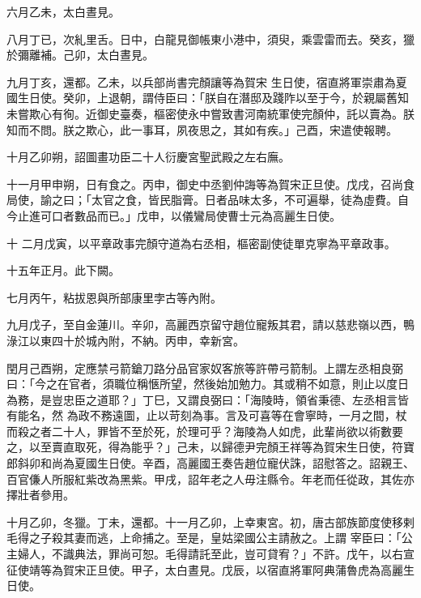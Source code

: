\begin{pinyinscope}
 六月乙未，太白晝見。



 八月丁已，次糺里舌。日中，白龍見御帳東小港中，須臾，乘雲雷而去。癸亥，獵於彌離補。己卯，太白晝見。



 九月丁亥，還都。乙未，以兵部尚書完顏讓等為賀宋
 生日使，宿直將軍崇肅為夏國生日使。癸卯，上退朝，謂侍臣曰：「朕自在潛邸及踐阼以至于今，於親屬舊知未嘗欺心有徇。近御史臺奏，樞密使永中嘗致書河南統軍使完顏仲，託以賣為。朕知而不問。朕之欺心，此一事耳，夙夜思之，其如有疾。」己酉，宋遣使報聘。



 十月乙卯朔，詔圖畫功臣二十人衍慶宮聖武殿之左右廡。



 十一月甲申朔，日有食之。丙申，御史中丞劉仲誨等為賀宋正旦使。戊戌，召尚食局使，諭之曰；「太官之食，皆民脂膏。日者品味太多，不可遍舉，徒為虛費。自今止進可口者數品而已。」戊申，以儀鸞局使曹士元為高麗生日使。



 十
 二月戊寅，以平章政事完顏守道為右丞相，樞密副使徒單克寧為平章政事。



 十五年正月。此下闕。



 七月丙午，粘拔恩與所部康里孛古等內附。



 九月戊子，至自金蓮川。辛卯，高麗西京留守趙位寵叛其君，請以慈悲嶺以西，鴨淥江以東四十於城內附，不納。丙申，幸新宮。



 閏月己酉朔，定應禁弓箭鎗刀路分品官家奴客旅等許帶弓箭制。上謂左丞相良弼曰：「今之在官者，須職位稱愜所望，然後始加勉力。其或稍不如意，則止以度日為務，是豈忠臣之道耶？」丁巳，又謂良弼曰：「海陵時，領省秉德、左丞相言皆有能名，然
 為政不務遠圖，止以苛刻為事。言及可喜等在會寧時，一月之間，杖而殺之者二十人，罪皆不至於死，於理可乎？海陵為人如虎，此輩尚欲以術數要之，以至賣直取死，得為能乎？」己未，以歸德尹完顏王祥等為賀宋生日使，符寶郎斜卯和尚為夏國生日使。辛酉，高麗國王奏告趙位寵伏誅，詔慰答之。詔親王、百官傔人所服紅紫改為黑紫。甲戌，詔年老之人毋注縣令。年老而任從政，其佐亦擇壯者參用。



 十月乙卯，冬獵。丁未，還都。十一月乙卯，上幸東宮。初，唐古部族節度使移剌毛得之子殺其妻而逃，上命捕之。至是，皇姑梁國公主請赦之。上謂
 宰臣曰：「公主婦人，不識典法，罪尚可恕。毛得請託至此，豈可貸宥？」不許。戊午，以右宣征使靖等為賀宋正旦使。甲子，太白晝見。戊辰，以宿直將軍阿典蒲魯虎為高麗生日使。




\end{pinyinscope}
